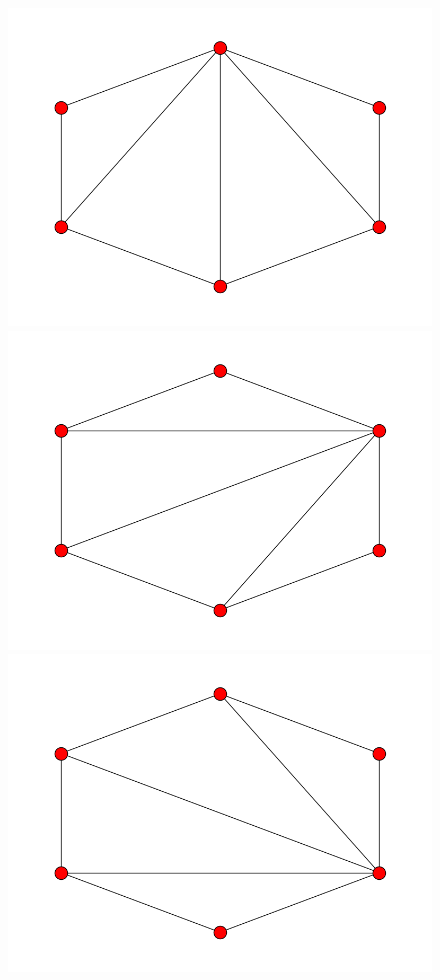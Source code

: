 \documentclass[fontsize=10pt]{article}
\begin{document}
\begin{enumerate}
\begin{figure}[hbtp]
\centering
\includegraphics[scale=0.1]{imgs/hexagon/hexagon_1.png}
\includegraphics[scale=0.1]{imgs/hexagon/hexagon_2.png}
\includegraphics[scale=0.1]{imgs/hexagon/hexagon_3.png}

\end{figure}
\end{enumerate}
\end{document}
